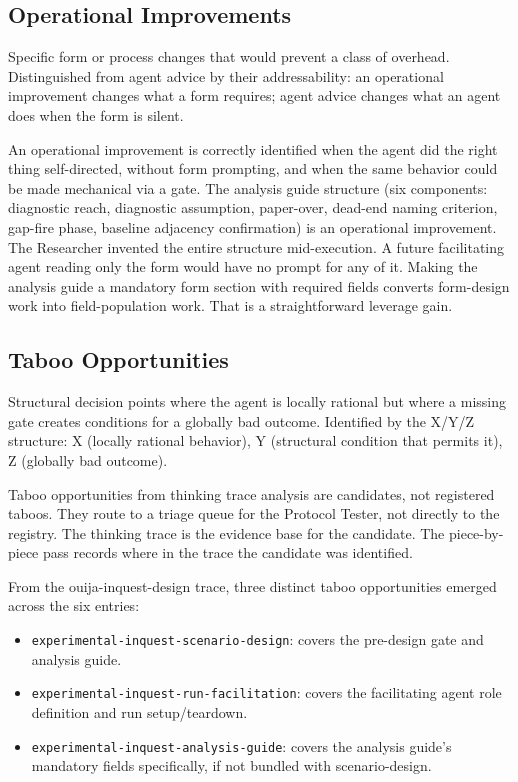 \documentclass[11pt,a4paper]{article}
\begin{document}
\subsection{Operational Improvements}

Specific form or process changes that would prevent a class of overhead.
Distinguished from agent advice by their addressability: an operational
improvement changes what a form requires; agent advice changes what an agent
does when the form is silent.

An operational improvement is correctly identified when the agent did the right
thing self-directed, without form prompting, and when the same behavior could
be made mechanical via a gate. The analysis guide structure (six components:
diagnostic reach, diagnostic assumption, paper-over, dead-end naming criterion,
gap-fire phase, baseline adjacency confirmation) is an operational improvement.
The Researcher invented the entire structure mid-execution. A future
facilitating agent reading only the form would have no prompt for any of it.
Making the analysis guide a mandatory form section with required fields
converts form-design work into field-population work. That is a straightforward
leverage gain.

\subsection{Taboo Opportunities}

Structural decision points where the agent is locally rational but where a
missing gate creates conditions for a globally bad outcome. Identified by the
X/Y/Z structure: X (locally rational behavior), Y (structural condition that
permits it), Z (globally bad outcome).

Taboo opportunities from thinking trace analysis are candidates, not registered
taboos. They route to a triage queue for the Protocol Tester, not directly to
the registry. The thinking trace is the evidence base for the candidate. The
piece-by-piece pass records where in the trace the candidate was identified.

From the ouija-inquest-design trace, three distinct taboo opportunities emerged
across the six entries:

\begin{itemize}
  \item \texttt{experimental-inquest-scenario-design}: covers the pre-design
    gate and analysis guide.
  \item \texttt{experimental-inquest-run-facilitation}: covers the facilitating
    agent role definition and run setup/teardown.
  \item \texttt{experimental-inquest-analysis-guide}: covers the analysis
    guide's mandatory fields specifically, if not bundled with scenario-design.
\end{itemize}
\end{document}
